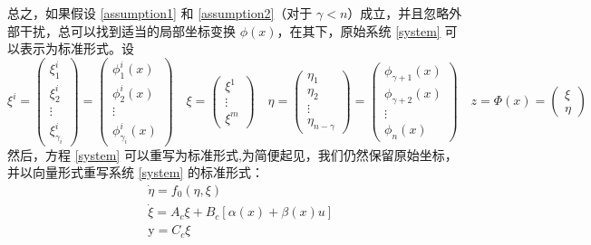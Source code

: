   总之，如果假设 \ref{assumption1} 和 \ref{assumption2}（对于 $\gamma < n$）成立，并且忽略外部干扰，总可以找到适当的局部坐标变换 $\phi(x)$，在其下，原始系统 \eqref{system} 可以表示为标准形式。设 
  \begin{equation}
	\xi^i=\begin{pmatrix}\xi_1^i\\\xi_2^i\\\vdots\\\xi_{\gamma_i}^i\end{pmatrix}=\begin{pmatrix}\phi_1^i(x)\\\phi_2^i(x)\\\vdots\\\phi_{\gamma_i}^i(x)\end{pmatrix} \quad  
	  \xi=\begin{pmatrix}\xi^1 \\ \vdots \\ \xi^m\end{pmatrix} \quad  
	  \eta=\begin{pmatrix}\eta_1\\\eta_2\\\vdots\\\eta_{n-\gamma}\end{pmatrix}=\begin{pmatrix}\phi_{\gamma+1}(x)\\\phi_{\gamma+2}(x)\\\vdots\\\phi_n(x)\end{pmatrix} \quad   
	  z=\Phi(x)=\begin{pmatrix}\xi\\\eta\end{pmatrix}
	  \label{stran}
  \end{equation}
  然后，方程 \eqref{system} 可以重写为标准形式,为简便起见，我们仍然保留原始坐标，并以向量形式重写系统 \eqref{system} 的标准形式：
  \begin{equation}
	\begin{aligned}&\dot{\eta}= f_{0}(\eta,\xi)\\&\dot{\xi}= A_{c}\xi+B_{c}[\alpha(x)+\beta(x)u]\\&\text{y}= C_{c}\xi\end{aligned}
  \end{equation}
